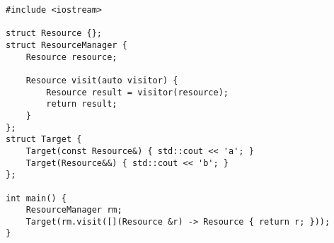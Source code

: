 \begin{lstlisting}[title=\href{https://godbolt.org/z/_VuyfB}{\texttt{godbolt.org/z/\_VuyfB}}]
#include <iostream>

struct Resource {};
struct ResourceManager {
    Resource resource;

    Resource visit(auto visitor) {
        Resource result = visitor(resource);
        return result;
    }
};
struct Target {
    Target(const Resource&) { std::cout << 'a'; }
    Target(Resource&&) { std::cout << 'b'; }
};

int main() {
    ResourceManager rm;
    Target(rm.visit([](Resource &r) -> Resource { return r; }));
}
\end{lstlisting}
